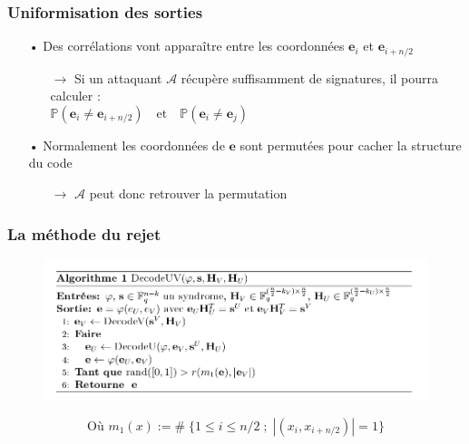 \documentclass[10pt,a4paper]{beamer}
\theoremstyle{plain}
\theoremstyle{definition}
\newcommand{\e}{\mathbf{e}}
\begin{document}
\begin{frame}
\frametitle{Uniformisation des sorties}

\begin{itemize}
\item[•] Des corrélations vont apparaître entre les coordonnées $\e_i$ et $\e_{i+n/2}$
\vspace{0.05in}
	\begin{itemize}
	\item[$\rightarrow$] Si un attaquant $\mathcal{A}$ récupère suffisamment de signatures, il pourra calculer :
$$\mathbb{P}(\mathbf{e}_i \neq \mathbf{e}_{i+n/2})\quad \text{et}\quad\mathbb{P}(\mathbf{e}_i \neq \mathbf{e}_{j})\qquad\qquad\qquad\qquad\qquad\qquad\qquad\qquad\qquad\qquad$$
	\end{itemize}
	
\vspace{0.3in}
\item[•] Normalement les coordonnées de $\e$ sont permutées pour cacher la structure du code
\vspace{0.05in}
	\begin{itemize}
	\item[$\rightarrow$] $\mathcal{A}$ peut donc retrouver la permutation
	\end{itemize}
\end{itemize}

\end{frame}

\begin{frame}[fragile]
\frametitle{La méthode du rejet}
\vspace{-0.3in}
\begin{figure}[h]
\begin{center}
\includegraphics [scale=0.38]{algo_UV.png}
\end{center}
\end{figure}
$$ \text{Où  } m_1(x) := \# \; \{1  \leq i \leq n/2 \;;\; |(x_i, x_{i+n/2})| = 1\}$$
\end{frame}
\end{document}

